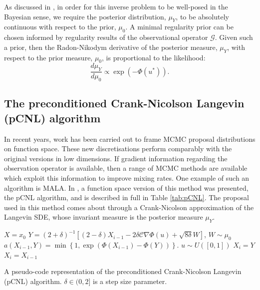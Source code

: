 \documentclass[final]{siamltex}
\begin{document}
As discussed in \cite{stuart2010inverse,cotter2009bayesian},
in order for this inverse problem to be well-posed in the Bayesian
sense, we require the posterior distribution, $\mu_Y$, to be absolutely
continuous with respect to the prior, $\mu_0$. A
minimal regularity prior can be chosen informed by regularity results
of the observational operator $\mathcal{G}$. Given such a prior, then
the Radon-Nikodym derivative of the posterior measure, $\mu_Y$, with
respect to the prior measure, $\mu_0$, is proportional to the
likelihood:
\begin{equation}\label{eqn:RND}
	\frac{d\mu_Y}{d\mu_0} \propto \exp \left ( -\Phi(u^*) \right ).
\end{equation}

\subsection{The preconditioned Crank-Nicolson Langevin (pCNL) algorithm}\label{Sec:pCNL}
In recent years, work has been carried out to frame MCMC proposal
distributions on function space\cite{cotter2013mcmc}. These new
discretisations perform comparably with the original versions in low
dimensions. If gradient information regarding the observation operator is
available, then a range of MCMC methods are available which exploit this information to improve mixing rates. One
example of such an algorithm is MALA. In \cite{cotter2013mcmc}, a function space version of this
method was presented, the pCNL algorithm, and is described in full in Table
\ref{tab:pCNL}. The proposal used in this method comes about through
a Crank-Nicolson approximation of the Langevin SDE, whose invariant
measure is the posterior measure $\mu_Y$.

\begin{table}
\begin{mdframed}
\begin{algorithmic}
\STATE $X = x_0$
\STATE $Y = (2+\delta)^{-1}\left[(2 - \delta)X_{i-1}-
2\delta\mathcal{C}\nabla \Phi(u)+
\sqrt{8\delta} W\right] $, $W \sim \mu_0$
\STATE $a(X_{i-1},Y) = \min \left \{ 1,  \exp(\Phi(X_{i-1}) - \Phi(Y) ) \right \}$.
\STATE $u \sim U([0,1])$
\STATE $X_i = Y$
\ELSE 
\STATE $X_i = X_{i-1}$
\ENDIF
\ENDFOR
\end{algorithmic}
\end{mdframed}\caption{A pseudo-code representation of the preconditioned Crank-Nicolson Langevin
   (pCNL) algorithm. $\delta \in (0,2]$ is a step size parameter.}
\label{tab:pCNL}
\end{table}
\end{document}
